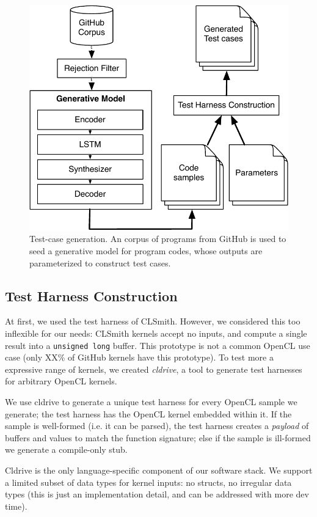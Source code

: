 \begin{figure}
  \centering
  \includegraphics[width=.85\columnwidth]{img/clgen} %
  \caption{%
    Test-case generation. An corpus of programs from GitHub is used to seed a generative model for program codes, whose outputs are parameterized to construct test cases.%
  }%
  \label{fig:deeptune}
\end{figure}

\subsection{Test Harness Construction}

At first, we used the test harness of CLSmith. However, we considered this too inflexible for our needs: CLSmith kernels accept no inputs, and compute a single result into a \texttt{unsigned long} buffer. This prototype is not a common OpenCL use case (only XX\% of GitHub kernels have this prototype). To test more a expressive range of kernels, we created \emph{cldrive}, a tool to generate test harnesses for arbitrary OpenCL kernels.

We use cldrive to generate a unique test harness for every OpenCL sample we generate; the test harness has the OpenCL kernel embedded within it. If the sample is well-formed (i.e. it can be parsed), the test harness creates a \emph{payload} of buffers and values to match the function signature; else if the sample is ill-formed we generate a compile-only stub. 

Cldrive is the only language-specific component of our software stack. We support a limited subset of data types for kernel inputs: no structs, no irregular data types (this is just an implementation detail, and can be addressed with more dev time).
